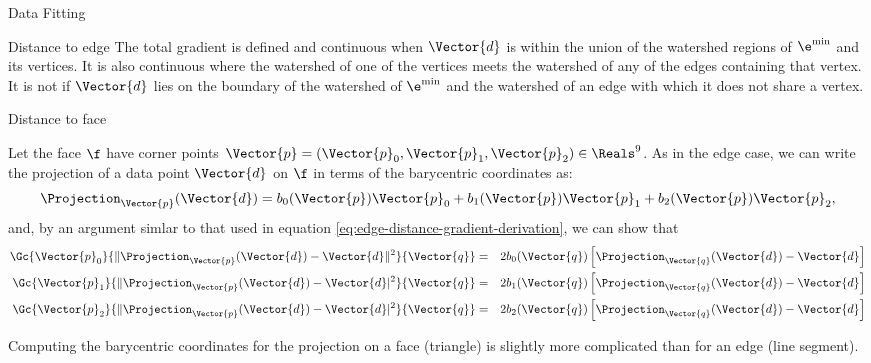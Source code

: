 \begin{plSection}{Data Fitting}
\begin{plSection}{Distance to edge}
The total gradient is defined and continuous
when $\Vector{d}$ is within the union of the watershed regions
of $\e^{\min}$ and its vertices.
It is also continuous where the watershed of one of the vertices
meets the watershed of any of the edges containing that vertex.
It is not if $\Vector{d}$ lies on the boundary of the
watershed of $\e^{\min}$ and the watershed of an
edge with which it does not share a vertex.

\end{plSection}%
\begin{plSection}{Distance to face}
\label{sec:Distance-to-face}

Let the face $\f$ have corner points $\Vector{p} = (\Vector{p}_0, \Vector{p}_1, \Vector{p}_2) \in \Reals^9$.
As in the edge case,
we can write the projection of a data point $\Vector{d}$ on $\f$
in terms of the barycentric coordinates as:
\begin{equation}
\Projection_\Vector{p} (\Vector{d}) = b_0(\Vector{p}) \Vector{p}_0 + b_1(\Vector{p}) \Vector{p}_1 + b_2(\Vector{p}) \Vector{p}_2,
\end{equation}
and, by an argument simlar to that used in
equation \ref{eq:edge-distance-gradient-derivation},
we can show that
\begin{eqnarray}
\label{eq:face-distance-gradient}
\Gc{\Vector{p}_0}{ \| \Projection_{\Vector{p}} (\Vector{d}) - \Vector{d} \|^2 }{\Vector{q}}
& = & 2 b_0(\Vector{q}) \left[ \Projection_{\Vector{q}} (\Vector{d}) - \Vector{d} \right]
\\
\Gc{\Vector{p}_1}{ \| \Projection_{\Vector{p}} (\Vector{d}) - \Vector{d}|^2 }{\Vector{q}}
& = & 2 b_1(\Vector{q}) \left[ \Projection_\Vector{q} (\Vector{d}) - \Vector{d} \right]
\nonumber
\\
\Gc{\Vector{p}_2}{ \| \Projection_{\Vector{p}} (\Vector{d}) - \Vector{d}|^2 }{\Vector{q}}
& = & 2 b_2(\Vector{q}) \left[ \Projection_\Vector{q} (\Vector{d}) - \Vector{d} \right]
\nonumber
\end{eqnarray}

Computing the barycentric coordinates for the projection
on a face (triangle) is slightly more complicated than
for an edge (line segment).


\end{plSection}
\end{plSection}
